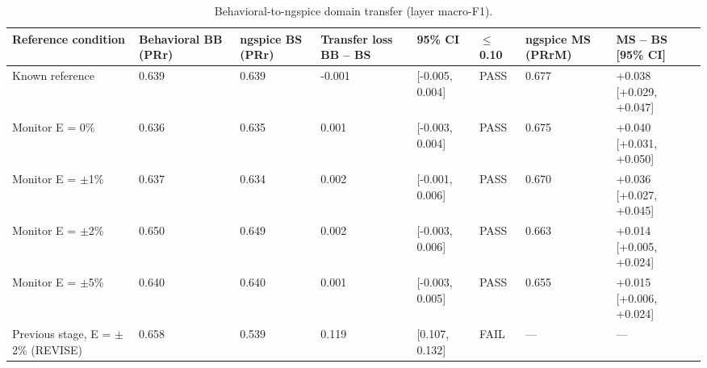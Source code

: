 \begin{table}[H]
\caption{Behavioral-to-ngspice domain transfer (layer macro-F1).\label{tab:table09_domain_transfer}}
\centering
\footnotesize
\begin{tabular}{p{3.2cm}p{1.5cm}p{1.5cm}p{1.5cm}p{1.5cm}p{1.5cm}p{1.5cm}p{1.5cm}}
\toprule
\textbf{Reference condition} & \textbf{Behavioral BB (PRr)} & \textbf{ngspice BS (PRr)} & \textbf{Transfer loss BB -- BS} & \textbf{95\% CI} & \textbf{$\leq$ 0.10} & \textbf{ngspice MS (PRrM)} & \textbf{MS -- BS [95\% CI]} \\
\midrule
Known reference & 0.639 & 0.639 & -0.001 & [-0.005, 0.004] & PASS & 0.677 & +0.038 [+0.029, +0.047] \\
Monitor E = 0\% & 0.636 & 0.635 & 0.001 & [-0.003, 0.004] & PASS & 0.675 & +0.040 [+0.031, +0.050] \\
Monitor E = $\pm$1\% & 0.637 & 0.634 & 0.002 & [-0.001, 0.006] & PASS & 0.670 & +0.036 [+0.027, +0.045] \\
Monitor E = $\pm$2\% & 0.650 & 0.649 & 0.002 & [-0.003, 0.006] & PASS & 0.663 & +0.014 [+0.005, +0.024] \\
Monitor E = $\pm$5\% & 0.640 & 0.640 & 0.001 & [-0.003, 0.005] & PASS & 0.655 & +0.015 [+0.006, +0.024] \\
Previous stage, E = $\pm$2\% (REVISE) & 0.658 & 0.539 & 0.119 & [0.107, 0.132] & FAIL & --- & --- \\
\bottomrule
\end{tabular}
\par\vspace{2pt}
\end{table}

